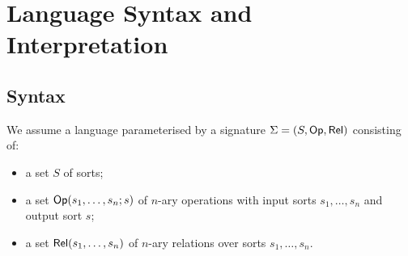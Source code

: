 \section{Language Syntax and Interpretation}

\subsection{Syntax}

We assume a language parameterised by a signature $\Sigma = (S, \mathsf{Op}, \mathsf{Rel})$ consisting of:
\begin{itemize}
\item a set $S$ of sorts;
\item a set $\mathsf{Op}(s_1, \ldots, s_n; s)$ of $n$-ary operations with input sorts $s_1, \ldots, s_n$ and output
sort $s$;
\item a set $\mathsf{Rel}(s_1, \ldots, s_n)$ of $n$-ary relations over sorts $s_1, \ldots, s_n$.
\end{itemize}

\noindent {}



%

